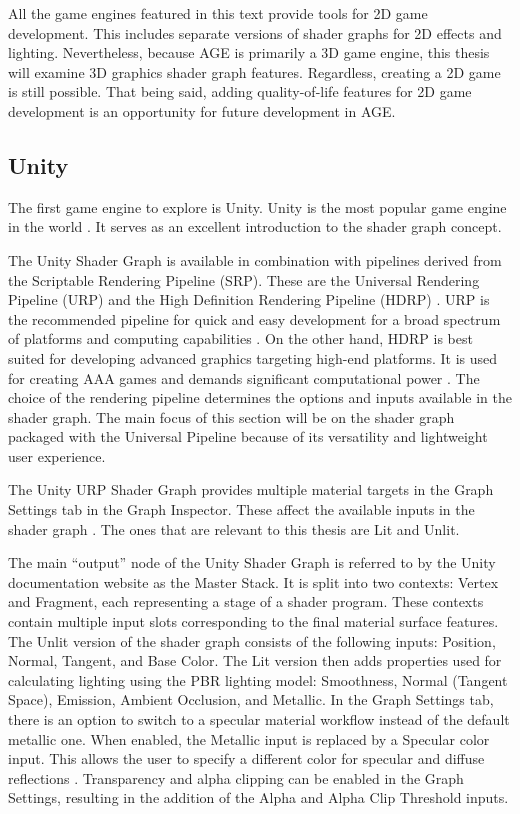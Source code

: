 \documentclass[
  digital,     %
  oneside,     %
  nosansbold,  %
  nocolorbold, %
  lof,         %
  lot,         %
]{fithesis4}
\begin{document}
All the game engines featured in this text provide tools for 2D game development. This includes separate versions
of shader graphs for 2D effects and lighting. Nevertheless, because AGE is primarily a 3D game engine, this thesis
will examine 3D graphics shader graph features. Regardless, creating a 2D game is still possible.
That being said, adding quality-of-life features for 2D game development is an opportunity
for future development in AGE.

\subsection{Unity}
The first game engine to explore is Unity. Unity is the most popular game engine in the world \cite{slashdata-game-engines}.
It serves as an excellent introduction to the shader graph concept.

The Unity Shader Graph is available in combination with pipelines derived from the Scriptable Rendering Pipeline (SRP).
These are the Universal Rendering Pipeline (URP) and the High Definition Rendering Pipeline (HDRP) \cite{unity-srp}.
URP is the recommended pipeline for quick and easy development for a broad spectrum of platforms and computing capabilities
\cite{unity-urp}. On the other hand, HDRP is best suited for developing advanced graphics targeting high-end platforms.
It is used for creating AAA games and demands significant computational power \cite{unity-hdrp}.
The choice of the rendering pipeline determines the options and inputs available in the shader graph.
The main focus of this section will be on the shader graph packaged with the Universal Pipeline because of its versatility
and lightweight user experience.

The Unity URP Shader Graph provides multiple material targets in the Graph Settings tab in the Graph Inspector.
These affect the available inputs in the shader graph \cite{unity-graph-settings}. The ones that are relevant
to this thesis are Lit and Unlit.

The main \enquote{output} node of the Unity Shader Graph is referred to by the Unity documentation website
\cite{unity-master-stack} as the Master Stack. It is split into two contexts: Vertex and Fragment,
each representing a stage of a shader program. These contexts contain multiple input slots corresponding
to the final material surface features. The Unlit version of the shader graph consists of the following
inputs: Position, Normal, Tangent, and Base Color. The Lit version then adds properties used for
calculating lighting using the PBR lighting model: Smoothness, Normal (Tangent Space),
Emission, Ambient Occlusion, and Metallic. In the Graph Settings tab, there is an option to switch to a specular material workflow
instead of the default metallic one. When enabled, the Metallic input is replaced by a Specular color input. This allows
the user to specify a different color for specular and diffuse reflections \cite{unity-metallic-specular}.
Transparency and alpha clipping can be enabled in the Graph Settings,
resulting in the addition of the Alpha and Alpha Clip Threshold inputs.
\end{document}
